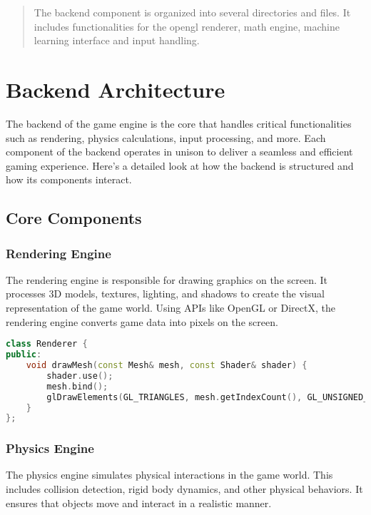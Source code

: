 






\begin{quote}
  The backend component is organized into several directories and files. It includes functionalities for the opengl renderer, math engine,
machine learning interface and input handling.
\end{quote}

\section*{Backend Architecture}

The backend of the game engine is the core that handles critical functionalities such as rendering, physics calculations, input processing, and more. Each component of the backend operates in unison to deliver a seamless and efficient gaming experience. Here's a detailed look at how the backend is structured and how its components interact.

\subsection*{Core Components}

\subsubsection*{Rendering Engine}

The rendering engine is responsible for drawing graphics on the screen. It processes 3D models, textures, lighting, and shadows to create the visual representation of the game world. Using APIs like OpenGL or DirectX, the rendering engine converts game data into pixels on the screen.


\begin{lstlisting}[caption={Rendering Example}, language=C++]
class Renderer {
public:
    void drawMesh(const Mesh& mesh, const Shader& shader) {
        shader.use();
        mesh.bind();
        glDrawElements(GL_TRIANGLES, mesh.getIndexCount(), GL_UNSIGNED_INT, 0);
    }
};
\end{lstlisting}

\subsubsection*{Physics Engine}

The physics engine simulates physical interactions in the game world. This includes collision detection, rigid body dynamics, and other physical behaviors. It ensures that objects move and interact in a realistic manner.

